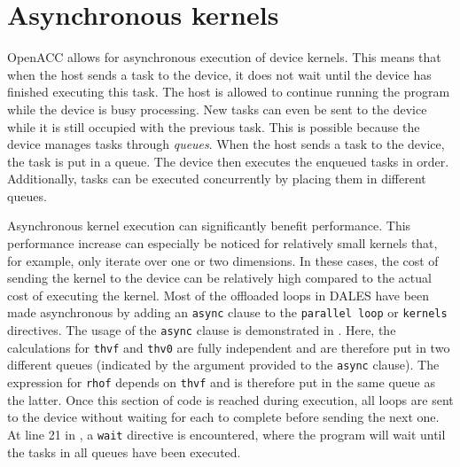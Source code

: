 

\section{Asynchronous kernels}
OpenACC allows for asynchronous execution of device kernels. This means that when the host sends a task to the device, it does not wait until the device has finished executing this task. The host is allowed to continue running the program while the device is busy processing. New tasks can even be sent to the device while it is still occupied with the previous task. This is possible because the device manages tasks through \emph{queues}. When the host sends a task to the device, the task is put in a queue. The device then executes the enqueued tasks in order. Additionally, tasks can be executed concurrently by placing them in different queues.

Asynchronous kernel execution can significantly benefit performance. This performance increase can especially be noticed for relatively small kernels that, for example, only iterate over one or two dimensions. In these cases, the cost of sending the kernel to the device can be relatively high compared to the actual cost of executing the kernel. Most of the offloaded loops in DALES have been made asynchronous by adding an \texttt{async} clause to the \texttt{parallel loop} or \texttt{kernels} directives. The usage of the \texttt{async} clause is demonstrated in . Here, the calculations for \texttt{thvf} and \texttt{thv0} are fully independent and are therefore put in two different queues (indicated by the argument provided to the \texttt{async} clause). The expression for \texttt{rhof} depends on \texttt{thvf} and is therefore put in the same queue as the latter. Once this section of code is reached during execution, all loops are sent to the device without waiting for each to complete before sending the next one. At line 21 in , a \texttt{wait} directive is encountered, where the program will wait until the tasks in all queues have been executed.

